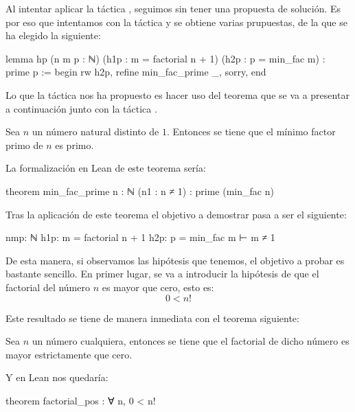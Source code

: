 \begin{itemize}
\begin{demostracion}
    Al intentar aplicar la táctica ,
    seguimos sin tener una propuesta de solución. Es por eso que intentamos con
    la táctica  y se obtiene varias prupuestas, de la
    que se ha elegido la siguiente:

    \begin{leancode}
lemma hp
  (n m p : ℕ)
  (h1p : m = factorial n + 1)
  (h2p : p = min_fac m)
  : prime p :=
begin
  rw h2p,
  refine min_fac_prime _,
  sorry,
end
    \end{leancode}

    Lo que la táctica  nos ha propuesto es hacer uso
    del teorema que se va a presentar a continuación junto con la táctica
    .

    \begin{teorema}
      Sea \(n\) un número natural distinto de \(1\). Entonces se tiene que el
      mínimo factor primo de \(n\) es primo.
    \end{teorema}

    La formalización en Lean de este teorema sería:
    \begin{leancode}
theorem min_fac_prime {n : ℕ} (n1 : n ≠ 1) : prime (min_fac n) 
    \end{leancode}

    Tras la aplicación de este teorema el objetivo a demostrar pasa a ser el
    siguiente:
    \begin{leancode}
nmp: ℕ
h1p: m = factorial n + 1
h2p: p = min_fac m
⊢ m ≠ 1
    \end{leancode}

    De esta manera, si observamos las hipótesis que tenemos, el objetivo a probar
    es bastante sencillo. En primer lugar, se va a introducir la hipótesis de
    que el factorial del número \(n\) es mayor que cero, esto es:
    \begin{equation}
      0<n!
    \end{equation}

    Este resultado se tiene de manera inmediata con el teorema siguiente:
    \begin{teorema}
      Sea \(n\) un número cualquiera, entonces se tiene que el factorial de dicho
      número es mayor estrictamente que cero.
    \end{teorema}

    Y en Lean nos quedaría:
    \begin{leancode}
theorem factorial_pos : ∀ n, 0 < n!
    \end{leancode}


\end{demostracion}
\end{itemize}

